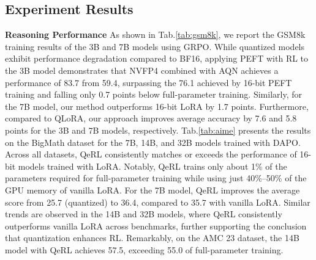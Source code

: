 \subsection{Experiment Results}


\textbf{Reasoning Performance}
As shown in Tab.\ref{tab:gsm8k}, we report the GSM8k training results of the 3B and 7B models using GRPO. While quantized models exhibit performance degradation compared to BF16, applying PEFT with RL to the 3B model demonstrates that NVFP4 combined with AQN achieves a performance of 83.7 from 59.4, surpassing the 76.1 achieved by 16-bit PEFT training and falling only 0.7 points below full-parameter training. Similarly, for the 7B model, our method outperforms 16-bit LoRA by 1.7 points. Furthermore, compared to QLoRA, our approach improves average accuracy by 7.6 and 5.8 points for the 3B and 7B models, respectively. Tab.\ref{tab:aime} presents the results on the BigMath dataset for the 7B, 14B, and 32B models trained with DAPO. Across all datasets, QeRL consistently matches or exceeds the performance of 16-bit models trained with LoRA. Notably, QeRL trains only about 1\% of the parameters required for full-parameter training while using just 40\%–50\% of the GPU memory of vanilla LoRA. For the 7B model, QeRL improves the average score from 25.7 (quantized) to 36.4, compared to 35.7 with vanilla LoRA. Similar trends are observed in the 14B and 32B models, where QeRL consistently outperforms vanilla LoRA across benchmarks, further supporting the conclusion that quantization enhances RL. Remarkably, on the AMC 23 dataset, the 14B model with QeRL achieves 57.5, exceeding 55.0 of full-parameter training.

